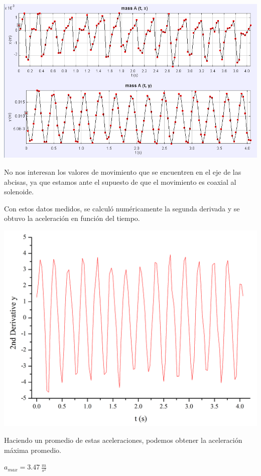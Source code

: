 \documentclass[a4paper,12pt]{article}
\newenvironment{Figure}
    {\par\medskip\noindent\minipage{\linewidth}}
    {\endminipage\par\medskip}
\begin{document}
        \begin{Figure}
            \centering

            \includegraphics[width=0.6\linewidth]{mediciones_movimientoLineal.png}
            \label{fig: mediciones_movimientoLineal}
        \end{Figure}

        No nos interesan los valores de movimiento que se encuentren en el eje de las abcisas, ya que estamos ante el supuesto de que el movimiento es coaxial al solenoide.

        Con estos datos medidos, se calculó numéricamente la segunda derivada y se obtuvo la aceleración en función del tiempo.

        \begin{Figure}
            \centering

            \includegraphics[width=0.6\linewidth]{mediciones_aceleracion.png}
            \label{fig: mediciones_aceleracion}
        \end{Figure}

        Haciendo un promedio de estas aceleraciones, podemos obtener la aceleración máxima promedio.

        $a_{max} = 3.47 \ \frac{m}{s^2}$
\end{document}
